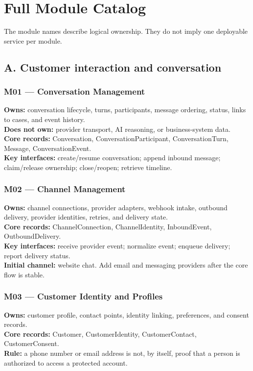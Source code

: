 \chapter{Full Module Catalog}

The module names describe logical ownership. They do not imply one deployable service per module.

\section{A. Customer interaction and conversation}

\subsection{M01 --- Conversation Management}

\textbf{Owns:} conversation lifecycle, turns, participants, message ordering, status, links to cases, and event history. \\ \textbf{Does not own:} provider transport, AI reasoning, or business-system data. \\ \textbf{Core records:} Conversation, ConversationParticipant, ConversationTurn, Message, ConversationEvent. \\ \textbf{Key interfaces:} create/resume conversation; append inbound message; claim/release ownership; close/reopen; retrieve timeline.

\subsection{M02 --- Channel Management}

\textbf{Owns:} channel connections, provider adapters, webhook intake, outbound delivery, provider identities, retries, and delivery state. \\ \textbf{Core records:} ChannelConnection, ChannelIdentity, InboundEvent, OutboundDelivery. \\ \textbf{Key interfaces:} receive provider event; normalize event; enqueue delivery; report delivery status. \\ \textbf{Initial channel:} website chat. Add email and messaging providers after the core flow is stable.

\subsection{M03 --- Customer Identity and Profiles}

\textbf{Owns:} customer profile, contact points, identity linking, preferences, and consent records. \\ \textbf{Core records:} Customer, CustomerIdentity, CustomerContact, CustomerConsent. \\ \textbf{Rule:} a phone number or email address is not, by itself, proof that a person is authorized to access a protected account.

